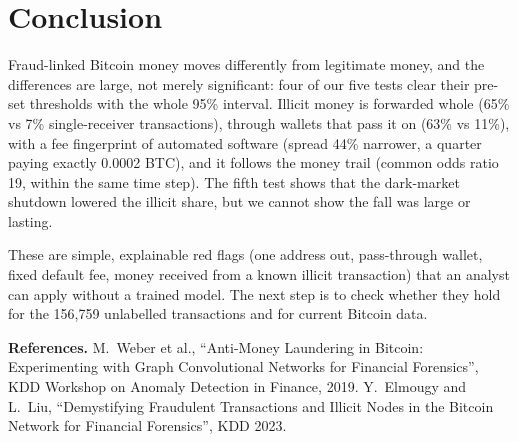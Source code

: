 \documentclass[10pt,a4paper,twocolumn]{article}
\begin{document}
\section{Conclusion}

Fraud-linked Bitcoin money moves differently from legitimate money, and the differences are
large, not merely significant: four of our five tests clear their pre-set thresholds with the
whole 95\% interval. Illicit money is forwarded whole (65\% vs 7\% single-receiver
transactions), through wallets that pass it on (63\% vs 11\%), with a fee fingerprint of
automated software (spread 44\% narrower, a quarter paying exactly 0.0002 BTC), and it
follows the money trail (common odds ratio 19, within the same time step). The fifth test
shows that the dark-market shutdown lowered the illicit share, but we cannot show the fall
was large or lasting.

These are simple, explainable red flags (one address out, pass-through wallet, fixed default
fee, money received from a known illicit transaction) that an analyst can apply without a
trained model. The next step is to check whether they hold for the 156{,}759 unlabelled
transactions and for current Bitcoin data.

{\footnotesize\textbf{References.} M.~Weber et al., ``Anti-Money Laundering in Bitcoin:
Experimenting with Graph Convolutional Networks for Financial Forensics'', KDD Workshop on
Anomaly Detection in Finance, 2019. Y.~Elmougy and L.~Liu, ``Demystifying Fraudulent
Transactions and Illicit Nodes in the Bitcoin Network for Financial Forensics'', KDD 2023.\par}
\end{document}

